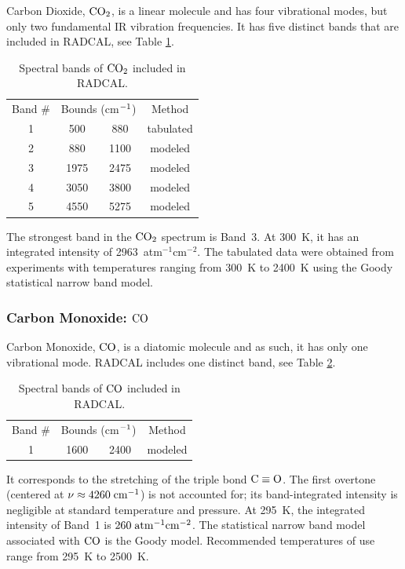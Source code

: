 Carbon Dioxide, $\rm CO_2$, is a linear molecule and has four vibrational modes, but only two fundamental IR vibration frequencies. It has five distinct bands that are included in RADCAL, see Table \ref{Table::CO2}.
\begin{table}[ht]
    \centering
    \caption{Spectral bands of $\rm CO_2$ included in RADCAL.}
    \vspace{0.1in}
    \label{Table::CO2}
    \begin{tabular}{|c|c|c|c|}
      \hline
      Band \# & \multicolumn{2}{|l|}{Bounds (cm$\rm ^{-1}$) } & Method \\
      \cline{1-4}
      1 &  500 & 880  & tabulated \\
      2 &  880 & 1100 & modeled \\
      3 & 1975 & 2475 & modeled \\
      4 & 3050 & 3800 & modeled \\
      5 & 4550 & 5275 & modeled \\
      \hline
    \end{tabular}
\end{table}
The strongest band in the $\rm CO_2$ spectrum is Band~3. At 300~K, it has an integrated intensity of 2963~atm$^{-1}$cm$^{-2}$. The tabulated data were obtained from experiments with temperatures ranging from 300~K to 2400~K using the Goody statistical narrow band model.

\subsubsection{Carbon Monoxide: $\rm CO$}

Carbon Monoxide, $\rm CO$, is a diatomic molecule and as such, it has only one vibrational mode. RADCAL includes one distinct band, see Table \ref{Table::CO}.
\begin{table}[h!]
    \centering
    \caption{Spectral bands of $\rm CO$ included in RADCAL.}
    \vspace{0.1in}
    \label{Table::CO}
    \begin{tabular}{|c|c|c|c|}
      \hline
      Band \# & \multicolumn{2}{|l|}{Bounds (cm$\rm ^{-1}$) } & Method \\
      \cline{1-4}
      1 & 1600 & 2400 & modeled \\
      \hline
    \end{tabular}
\end{table}
It corresponds to the stretching of the triple bond $\rm C \equiv O$. The first overtone (centered at $ \nu\approx 4260\;\rm {cm^{-1}}$) is not accounted for; its band-integrated intensity is negligible at standard temperature and pressure. At 295~K, the integrated intensity of Band~1 is $260\;\rm {atm^{-1}cm^{-2}}$.
The statistical narrow band model associated with $\rm CO$ is the Goody model. Recommended temperatures of use range from 295~K to 2500~K.

